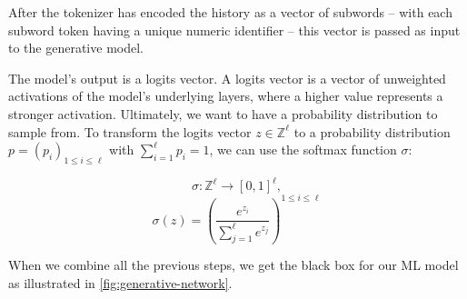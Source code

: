 After the tokenizer has encoded the history as a vector of subwords -- with each subword token having a unique numeric identifier -- this vector is passed as input to the generative model.

The model's output is a logits vector.
A logits vector is a vector of unweighted activations of the model's underlying layers, where a higher value represents a stronger activation.
Ultimately, we want to have a probability distribution to sample from.
To transform the logits vector $z \in \mathbb{Z}^\ell$ to a probability distribution $p = (p_i)_{1 \leq i \leq \ell}$ with $\sum_{i=1}^{\ell} p_i = 1$, we can use the softmax function $\sigma$:

$$\sigma \colon \mathbb{Z}^{\ell} \rightarrow [0,1]^{\ell},$$
$$\sigma(z) = \left(\frac{e^{z_i}}{\sum_{j=1}^{\ell} e^{z_j}}\right)^{1 \leq i \leq \ell}$$

When we combine all the previous steps, we get the black box for our ML model as illustrated in \autoref{fig:generative-network}.

